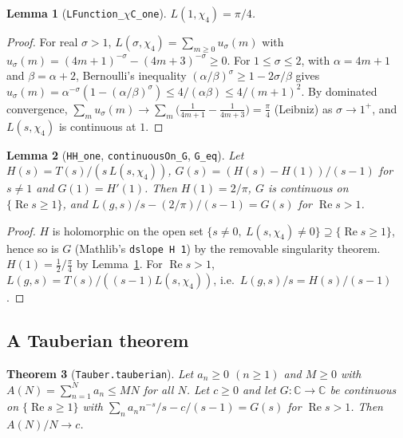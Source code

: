 \documentclass[11pt]{amsart}
\theoremstyle{plain}
\newtheorem{theorem}{Theorem}
\newtheorem{lemma}[theorem]{Lemma}
\theoremstyle{definition}
\newcommand{\code}[1]{\texttt{#1}}
\newcommand{\C}{\mathbb{C}}
\newcommand{\re}{\operatorname{Re}}
\begin{document}
\begin{lemma}[\texttt{LFunction\_\(\chi\)C\_one}]\label{lem:L1}
$L(1,\chi_4)=\pi/4$.
\end{lemma}

\begin{proof}
For real $\sigma>1$, $L(\sigma,\chi_4)=\sum_{m\ge0}u_\sigma(m)$ with $u_\sigma(m)=(4m+1)^{-\sigma}-(4m+3)^{-\sigma}\ge0$. For $1\le\sigma\le2$, with $\alpha=4m+1$ and $\beta=\alpha+2$, Bernoulli's inequality $(\alpha/\beta)^\sigma\ge1-2\sigma/\beta$ gives $u_\sigma(m)=\alpha^{-\sigma}(1-(\alpha/\beta)^\sigma)\le4/(\alpha\beta)\le4/(m+1)^2$. By dominated convergence, $\sum_mu_\sigma(m)\to\sum_m\bigl(\frac1{4m+1}-\frac1{4m+3}\bigr)=\frac\pi4$ (Leibniz) as $\sigma\to1^+$, and $L(s,\chi_4)$ is continuous at $1$.
\end{proof}

\begin{lemma}[\code{HH\_one}, \code{continuousOn\_G}, \code{G\_eq}]\label{lem:G}
Let $H(s)=T(s)/(s\,L(s,\chi_4))$, $G(s)=(H(s)-H(1))/(s-1)$ for $s\ne1$ and $G(1)=H'(1)$. Then $H(1)=2/\pi$, $G$ is continuous on $\{\re s\ge1\}$, and $L(g,s)/s-(2/\pi)/(s-1)=G(s)$ for $\re s>1$.
\end{lemma}

\begin{proof}
$H$ is holomorphic on the open set $\{s\ne0,\ L(s,\chi_4)\ne0\}\supseteq\{\re s\ge1\}$, hence so is $G$ (Mathlib's \code{dslope H 1}) by the removable singularity theorem. $H(1)=\frac12/\frac\pi4$ by Lemma~\ref{lem:L1}. For $\re s>1$, $L(g,s)=T(s)/((s-1)L(s,\chi_4))$, i.e.\ $L(g,s)/s=H(s)/(s-1)$.
\end{proof}

\subsection{A Tauberian theorem}

\begin{theorem}[\code{Tauber.tauberian}]\label{thm:tauber}
Let $a_n\ge0$ $(n\ge1)$ and $M\ge0$ with $A(N)=\sum_{n=1}^Na_n\le MN$ for all $N$. Let $c\ge0$ and let $G:\C\to\C$ be continuous on $\{\re s\ge1\}$ with $\sum_na_nn^{-s}/s-c/(s-1)=G(s)$ for $\re s>1$. Then $A(N)/N\to c$.
\end{theorem}
\end{document}
